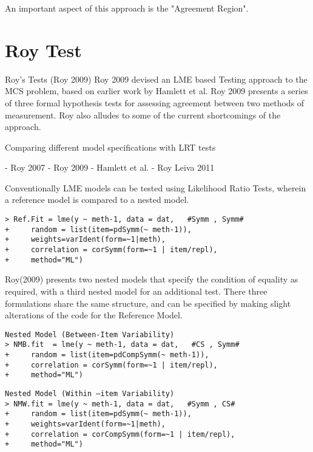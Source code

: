 \documentclass[12pt, a4paper]{report}
\begin{document}
An important aspect of this approach is the "Agreement Region".



\section*{Roy Test}

Roy’s Tests (Roy 2009)
Roy 2009 devised an LME based Testing approach to the MCS problem, based on earlier work by Hamlett et al. 
Roy 2009 presents a series of three formal hypothesis tests for assessing agreement between two methods of measurement.
Roy also alludes to some of the current shortcomings of the approach.


Comparing different model specifications with LRT tests

- Roy 2007
- Roy 2009
- Hamlett et al.
- Roy Leiva 2011



Conventionally LME models can be tested using Likelihood Ratio Tests, wherein a reference model is compared to a nested model.
\begin{verbatim}
> Ref.Fit = lme(y ~ meth-1, data = dat,   #Symm , Symm#
+     random = list(item=pdSymm(~ meth-1)), 
+     weights=varIdent(form=~1|meth),
+     correlation = corSymm(form=~1 | item/repl), 
+     method="ML")
\end{verbatim}
Roy(2009) presents two nested models that specify the condition of equality as required, with a third nested model for an additional test. There three formulations share the same structure, and can be specified by making slight alterations of the code for the Reference Model.
\begin{verbatim}
Nested Model (Between-Item Variability)
> NMB.fit  = lme(y ~ meth-1, data = dat,   #CS , Symm#
+     random = list(item=pdCompSymm(~ meth-1)),
+     correlation = corSymm(form=~1 | item/repl), 
+     method="ML")
\end{verbatim}



\begin{verbatim}
Nested Model (Within –item Variability)
> NMW.fit = lme(y ~ meth-1, data = dat,   #Symm , CS# 
+     random = list(item=pdSymm(~ meth-1)),
+     weights=varIdent(form=~1|meth), 
+     correlation = corCompSymm(form=~1 | item/repl), 
+     method="ML")
\end{verbatim}
\end{document}
